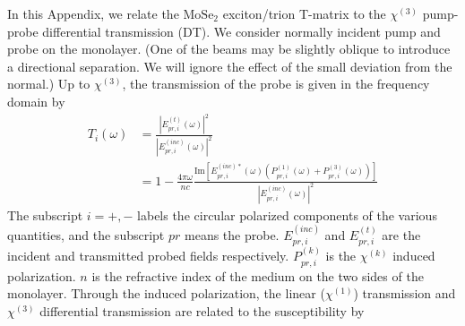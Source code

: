 \documentclass[aps,prb,superscriptaddress,letterpaper,amsmath,amssymb,twocolumn,preprintnumbers]{revtex4}
\begin{document}
In this Appendix, we relate the $\text{MoSe}_2$ exciton/trion T-matrix to the $\chi^{(3)}$ pump-probe differential transmission (DT). We consider normally incident pump and probe on the monolayer. (One of the beams may be slightly oblique to introduce a directional separation. We will ignore the effect of the small deviation from the normal.) Up to $\chi^{(3)}$, the transmission of the probe is given in the frequency domain by
\begin{align}
T_{i}(\omega) &= \frac {|E^{(t)}_{pr , i}(\omega)|^2} {|E^{(inc)}_{pr , i}(\omega)|^2} \nonumber \\
\label{trans-1.equ} &= 1 - \frac {4 \pi \omega} {n c} \frac {\mathrm{Im} \left[ E^{(inc) \ast}_{pr , i} (\omega) \left( P^{(1)}_{pr , i} (\omega) + P^{(3)}_{pr , i} (\omega) \right) \right]} {|E^{(inc)}_{pr , i}(\omega)|^2}
\end{align}
The subscript $i=+,-$ labels the circular polarized components of the various quantities, and the subscript $pr$ means the probe. $E^{(inc)}_{pr , i}$ and $E^{(t)}_{pr , i}$ are the incident and transmitted probed fields respectively. $P^{(k)}_{pr , i}$ is the $\chi^{(k)}$ induced polarization. $n$ is the refractive index of the medium on the two sides of the monolayer. Through the induced polarization, the linear ($\chi^{(1)}$) transmission and $\chi^{(3)}$ differential transmission are related to the susceptibility by
\end{document}
